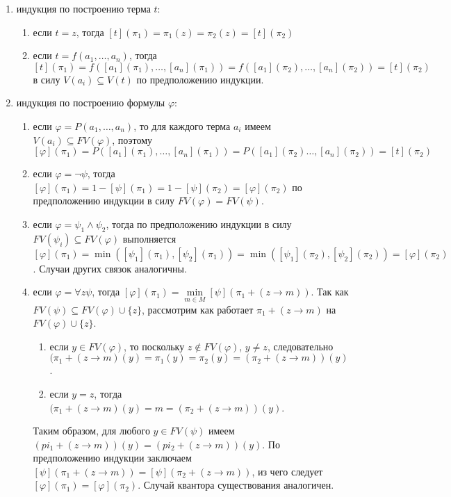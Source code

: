 \documentclass[a4paper, 10pt]{article}
\begin{document}
\begin{enumerate}
    \item индукция по построению терма $t$:
    \begin{enumerate}
        \item если $t=z$, тогда $[t](\pi_1)=\pi_1(z)=\pi_2(z)=[t](\pi_2)$
        \item если $t=f(a_1,\ldots,a_n)$, тогда $[t](\pi_1)=f([a_1](\pi_1),\ldots,[a_n](\pi_1))=f([a_1](\pi_2),\ldots,[a_n](\pi_2))=[t](\pi_2)$ в силу $V(a_i)\subseteq V(t)$ по предположению индукции.
    \end{enumerate}
    \item индукция по построению формулы $\varphi$: 
    \begin{enumerate}
        \item если $\varphi=P(a_1,\ldots,a_n)$, то для каждого терма $a_i$ имеем $V(a_i)\subseteq FV(\varphi)$, поэтому $[\varphi](\pi_1)=P([a_1](\pi_1),\ldots,[a_n](\pi_1))=P([a_1](\pi_2)\ldots,[a_n](\pi_2))=[t](\pi_2)$
        \item если $\varphi=\lnot \psi$, тогда $[\varphi](\pi_1)=1-[\psi](\pi_1)=1-[\psi](\pi_2)=[\varphi](\pi_2)$ по предположению индукции в силу $FV(\varphi)=FV(\psi)$.
        \item если $\varphi=\psi_1\land \psi_2$, тогда по предположению индукции в силу $FV(\psi_i)\subseteq FV(\varphi)$ выполняется $[\varphi](\pi_1)=\min([\psi_1](\pi_1),[\psi_2](\pi_1))=\min([\psi_1](\pi_2),[\psi_2](\pi_2))=[\varphi](\pi_2)$. Случаи других связок аналогичны.
        \item если $\varphi=\forall z\psi$, тогда $[\varphi](\pi_1)=\min\limits_{m\in M}[\psi](\pi_1 + (z\to m))$. Так как $FV(\psi)\subseteq FV(\varphi)\cup\{z\}$, рассмотрим как работает $\pi_1+(z\to m)$ на $FV(\varphi)\cup\{z\}$.
        \begin{enumerate}
            \item если $y\in FV(\varphi)$, то поскольку $z\not\in FV(\varphi)$, $y\not=z$, следовательно $(\pi_1+(z\to m)(y)=\pi_1(y)=\pi_2(y)=(\pi_2+(z\to m))(y)$.
            \item если $y=z$, тогда $(\pi_1+(z\to m)(y)=m=(\pi_2+(z\to m))(y)$.
        \end{enumerate}
        Таким образом, для любого $y\in FV(\psi)$ имеем $(pi_1+(z\to m))(y)=(pi_2+(z\to m))(y)$. По предположению индукции заключаем $[\psi](\pi_1+(z\to m))=[\psi](\pi_2+(z\to m))$, из чего следует $[\varphi](\pi_1)=[\varphi](\pi_2)$. Случай квантора существования аналогичен.
    \end{enumerate}
\end{enumerate}
\end{document}
